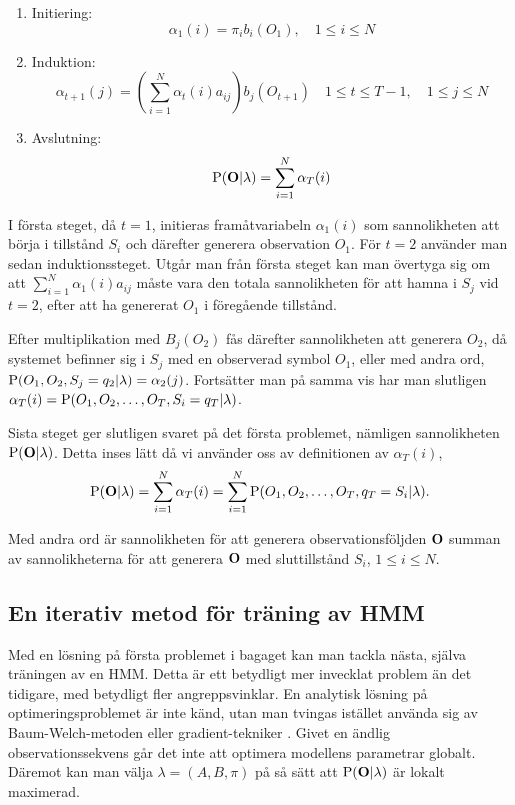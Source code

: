 \documentclass[../rapport_MVEX01-11-05]{subfiles}
\begin{document}
\begin{enumerate}
\item Initiering:
\begin{equation*}
\alpha_1(i) = \pi_ib_i(O_1), \quad 1\leq i \leq N
\end{equation*}

\item Induktion:
\begin{equation*}
\alpha_{t+1}(j) =
\left(\sum_{i=1}^N\alpha_t(i)a_{ij}\right)b_j(O_{t+1}) \quad 1 \leq t \leq T-1,\quad1 \leq j \leq N
\end{equation*}

\item Avslutning:
\begin{equation*}
\mathrm{P}(\mathbf{O}|\lambda) = \sum_{i=1}^N\alpha_T(i)
\end{equation*}
\end{enumerate}

I första steget, då $t=1$, initieras framåtvariabeln $\alpha_1(i)$ som
sannolikheten att börja i tillstånd $S_i$ och därefter generera
observation $O_1$. För $t=2$ använder man sedan induktionssteget. Utgår man
från första steget kan man övertyga sig om att
$\sum_{i=1}^N\alpha_1(i)a_{ij}$ måste vara den totala sannolikheten
för att hamna i $S_j$ vid $t=2$, efter att ha genererat $O_1$ i föregående
tillstånd.

Efter multiplikation med $B_j(O_{2})$ fås därefter
sannolikheten att generera $O_2$, då systemet befinner sig i $S_j$ med
en
observerad symbol $O_1$, eller med andra ord, $\mathrm{P}(O_1,O_2,S_j
= q_2 | \lambda) = \alpha_2(j)$. Fortsätter man på samma vis har man
slutligen $\alpha_T(i) = \mathrm{P}(O_1,O_2,\dots,O_T,S_i = q_T |
\lambda)$.

Sista steget ger slutligen svaret på det första problemet, nämligen
sannolikheten $\mathrm{P}(\mathbf{O}|\lambda)$. Detta inses lätt då vi
använder oss av definitionen av $\alpha_T(i)$, 
\begin{equation*}
\mathrm{P}(\mathbf{O}|\lambda) = \sum_{i=1}^N\alpha_T(i) =
\sum_{i=1}^N\mathrm{P}(O_1,O_2,\dots,O_T,q_T = S_i|\lambda). 
\end{equation*} 

Med andra ord är sannolikheten för att generera observationsföljden
$\mathbf{O}$ summan av sannolikheterna för att generera $\mathbf{O}$ med
sluttillstånd $S_i$, $1 \leq i \leq N$.

\subsection{En iterativ metod för träning av HMM}\label{sec:hmm:train}
Med en lösning på första problemet i bagaget kan man tackla nästa,
själva träningen av en HMM. Detta är ett betydligt mer invecklat
problem än det tidigare, med betydligt fler angreppsvinklar. En
analytisk lösning på optimeringsproblemet är inte känd, utan man
tvingas istället använda sig av Baum-Welch-metoden eller
gradient-tekniker \cite{Dempster77,Levinson83}. 
Givet en ändlig observationssekvens går det inte att optimera
modellens parametrar globalt.
Däremot kan man välja $\lambda = (A,B,\pi)$ på så sätt att $\mathrm{P}(\mathbf{O}|\lambda)$ är lokalt
maximerad. 
\end{document}
